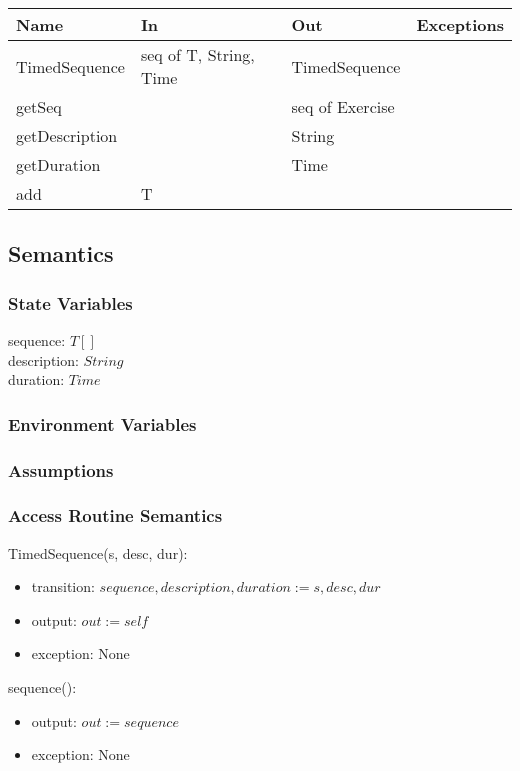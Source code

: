 \documentclass[12pt, titlepage]{article}
\begin{document}
\begin{center}
	\begin{tabular}{p{4cm} p{4cm} p{4cm} p{2cm}}
		\hline
		\textbf{Name} & \textbf{In} & \textbf{Out} & \textbf{Exceptions} \\
		\hline
		TimedSequence & seq of T, String, Time & TimedSequence &  \\
		getSeq &  & seq of Exercise &  \\
		getDescription &  & String &  \\
		getDuration &  & Time &  \\
		add & T & &  \\
		\hline
	\end{tabular}
\end{center}

\subsection{Semantics}

\subsubsection{State Variables}
sequence: $T[]$ \\
description: $String$ \\
duration: $Time$ \\

\subsubsection{Environment Variables}

\subsubsection{Assumptions}

\subsubsection{Access Routine Semantics}

TimedSequence(s, desc, dur):
\begin{itemize}
	\item transition: $sequence, description, duration := s, desc, dur$
	\item output: $out := self$
	\item exception: None
\end{itemize}

sequence():
\begin{itemize}
	\item output: $out := sequence$
	\item exception: None
\end{itemize}
\end{document}
